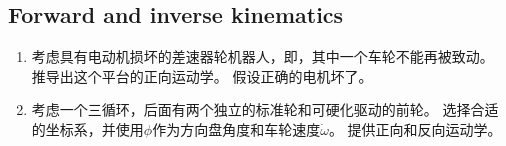 \subsection*{Forward and inverse kinematics}
\begin{enumerate}

\item 考虑具有电动机损坏的差速器轮机器人，即，其中一个车轮不能再被致动。 推导出这个平台的正向运动学。 假设正确的电机坏了。
\item 考虑一个三循环，后面有两个独立的标准轮和可硬化驱动的前轮。 选择合适的坐标系，并使用$ \phi $作为方向盘角度和车轮速度$ \dot {\omega} $。 提供正向和反向运动学。
\end{enumerate}
\normalsize